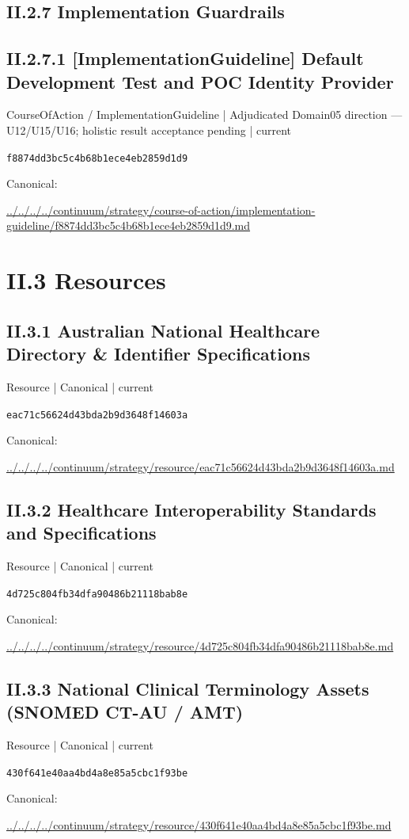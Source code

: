 \documentclass[10pt,a4paper]{article}
\begin{document}
\subsection*{II.2.7 Implementation Guardrails}
\subsection*{II.2.7.1 [ImplementationGuideline] Default Development Test and POC Identity Provider}
{\small CourseOfAction / ImplementationGuideline | Adjudicated Domain05 direction — U12/U15/U16; holistic result acceptance pending | current}\par
\texttt{f8874dd3bc5c4b68b1ece4eb2859d1d9}\par
Canonical: \par
{\footnotesize\url{../../../../continuum/strategy/course-of-action/implementation-guideline/f8874dd3bc5c4b68b1ece4eb2859d1d9.md}}\par
\section*{II.3 Resources}
\subsection*{II.3.1 Australian National Healthcare Directory \& Identifier Specifications}
{\small Resource | Canonical | current}\par
\texttt{eac71c56624d43bda2b9d3648f14603a}\par
Canonical: \par
{\footnotesize\url{../../../../continuum/strategy/resource/eac71c56624d43bda2b9d3648f14603a.md}}\par
\subsection*{II.3.2 Healthcare Interoperability Standards and Specifications}
{\small Resource | Canonical | current}\par
\texttt{4d725c804fb34dfa90486b21118bab8e}\par
Canonical: \par
{\footnotesize\url{../../../../continuum/strategy/resource/4d725c804fb34dfa90486b21118bab8e.md}}\par
\subsection*{II.3.3 National Clinical Terminology Assets (SNOMED CT-AU / AMT)}
{\small Resource | Canonical | current}\par
\texttt{430f641e40aa4bd4a8e85a5cbc1f93be}\par
Canonical: \par
{\footnotesize\url{../../../../continuum/strategy/resource/430f641e40aa4bd4a8e85a5cbc1f93be.md}}\par
\end{document}
